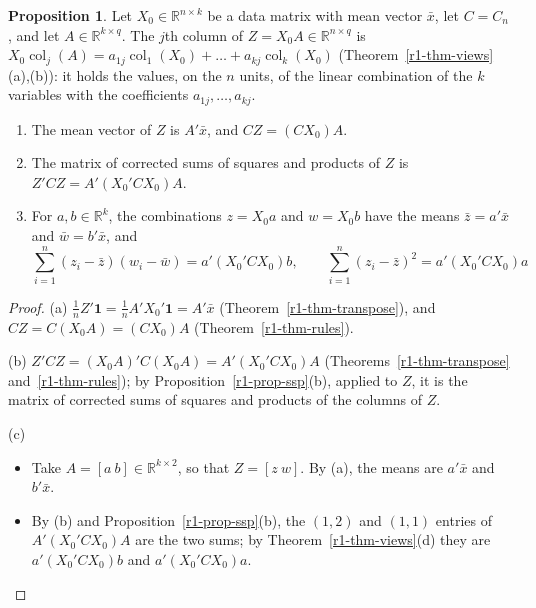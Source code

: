\documentclass[12pt]{article}
\newcommand{\R}{\mathbb R}
\newcommand{\one}{\mathbf 1}
\DeclareMathOperator{\col}{col}
\theoremstyle{definition}
\newtheorem{proposition}[theorem]{Proposition}
\begin{document}
\begin{proposition}\label{r1-prop-lincomb}
Let \(X_0\in\R^{n\times k}\) be a data matrix with mean vector \(\bar x\), let \(C=C_n\), and let
\(A\in\R^{k\times q}\). The \(j\)th column of \(Z=X_0A\in\R^{n\times q}\) is
\(X_0\col_j(A)=a_{1j}\col_1(X_0)+\dots+a_{kj}\col_k(X_0)\) (Theorem~\ref{r1-thm-views}(a),(b)): it holds the values,
on the \(n\) units, of the linear combination of the \(k\) variables with the coefficients \(a_{1j},\dots,a_{kj}\).
\begin{enumerate}
\item The mean vector of \(Z\) is \(A'\bar x\), and \(CZ=(CX_0)A\).
\item The matrix of corrected sums of squares and products of \(Z\) is \(Z'CZ=A'(X_0'CX_0)A\).
\item For \(a,b\in\R^k\), the combinations \(z=X_0a\) and \(w=X_0b\) have the means \(\bar z=a'\bar x\) and
\(\bar w=b'\bar x\), and
\[
\sum_{i=1}^n(z_i-\bar z)(w_i-\bar w)=a'(X_0'CX_0)b,\qquad \sum_{i=1}^n(z_i-\bar z)^2=a'(X_0'CX_0)a
\]
\end{enumerate}
\end{proposition}
\begin{proof}
(a) \(\frac1nZ'\one=\frac1nA'X_0'\one=A'\bar x\) (Theorem~\ref{r1-thm-transpose}), and \(CZ=C(X_0A)=(CX_0)A\)
(Theorem~\ref{r1-thm-rules}).

(b) \(Z'CZ=(X_0A)'C(X_0A)=A'(X_0'CX_0)A\) (Theorems~\ref{r1-thm-transpose} and~\ref{r1-thm-rules}); by
Proposition~\ref{r1-prop-ssp}(b), applied to \(Z\), it is the matrix of corrected sums of squares and products of the
columns of \(Z\).

(c)
\begin{itemize}
\item Take \(A=[a\ b]\in\R^{k\times2}\), so that \(Z=[z\ w]\). By (a), the means are \(a'\bar x\) and \(b'\bar x\).
\item By (b) and Proposition~\ref{r1-prop-ssp}(b), the \((1,2)\) and \((1,1)\) entries of \(A'(X_0'CX_0)A\) are the
two sums; by Theorem~\ref{r1-thm-views}(d) they are \(a'(X_0'CX_0)b\) and \(a'(X_0'CX_0)a\).
\end{itemize}
\end{proof}
\end{document}

